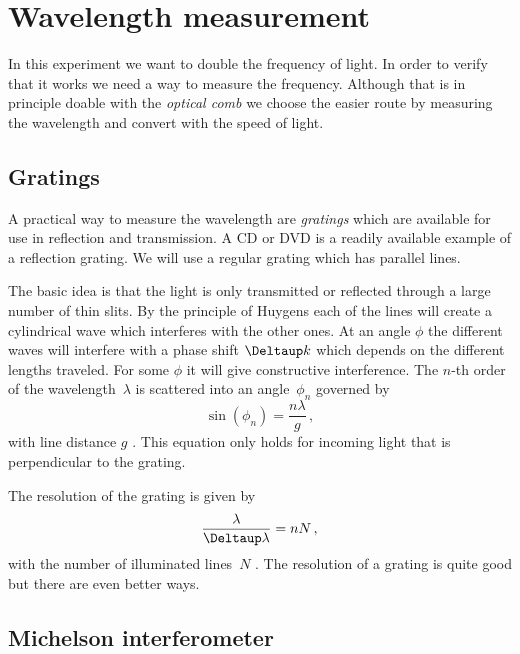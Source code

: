 \documentclass[11pt, english, fleqn, DIV=15, headinclude, BCOR=2cm]{scrreprt}
\begin{document}
\section{Wavelength measurement}

In this experiment we want to double the frequency of light. In order to verify
that it works we need a way to measure the frequency. Although that is in
principle doable with the \emph{optical comb} we choose the easier route by
measuring the wavelength and convert with the speed of light.

\subsection{Gratings}

A practical way to measure the wavelength are \emph{gratings} which are
available for use in reflection and transmission. A CD or DVD is a readily
available example of a reflection grating. We will use a regular grating which
has parallel lines.


The basic idea is that the light is only transmitted or reflected through a
large number of thin slits. By the principle of Huygens each of the lines will
create a cylindrical wave which interferes with the other ones. At an angle
$\phi$ the different waves will interfere with a phase shift $\Deltaup k$ which
depends on the different lengths traveled. For some $\phi$ it will give
constructive interference. The $n$-th order of the wavelength~$\lambda$ is
scattered into an angle~$\phi_n$ governed by
\[
    \sin(\phi_n) = \frac{n \lambda}{g} \,,
\]
with line distance $g$ \parencite{wikipedia/optisches_gitter}. This equation
only holds for incoming light that is perpendicular to the grating.

The resolution of the grating is given by
\[
    \frac{\lambda}{\Deltaup \lambda} = n N \,,
\]
with the number of illuminated lines~$N$
\parencite{wikipedia/optisches_gitter}. The resolution of a grating is quite
good but there are even better ways.

\subsection{Michelson interferometer}


\end{document}
